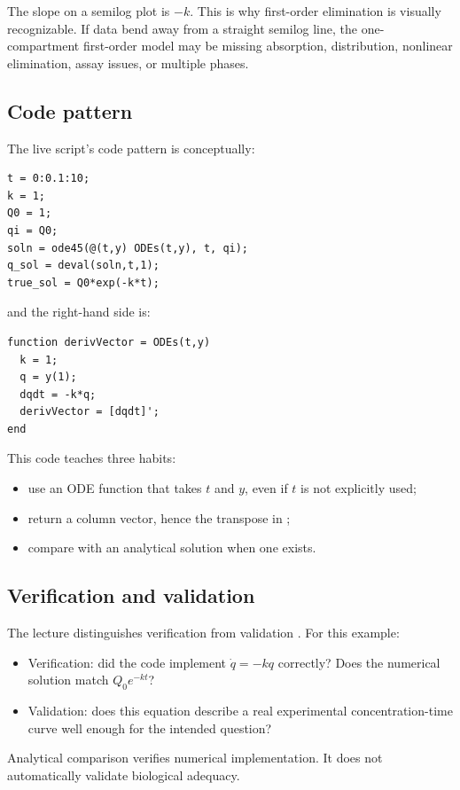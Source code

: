 \documentclass[a4paper]{article}
\newcommand{\code}[1]{\texttt{\detokenize{#1}}}
\begin{document}
The slope on a semilog plot is \(-k\). This is why first-order elimination is visually recognizable. If data bend away from a straight semilog line, the one-compartment first-order model may be missing absorption, distribution, nonlinear elimination, assay issues, or multiple phases.

\subsection{Code pattern}

The live script's code pattern is conceptually:
\begin{verbatim}
t = 0:0.1:10;
k = 1;
Q0 = 1;
qi = Q0;
soln = ode45(@(t,y) ODEs(t,y), t, qi);
q_sol = deval(soln,t,1);
true_sol = Q0*exp(-k*t);
\end{verbatim}
and the right-hand side is:
\begin{verbatim}
function derivVector = ODEs(t,y)
  k = 1;
  q = y(1);
  dqdt = -k*q;
  derivVector = [dqdt]';
end
\end{verbatim}

This code teaches three habits:
\begin{itemize}[leftmargin=2em]
  \item use an ODE function that takes \(t\) and \(y\), even if \(t\) is not explicitly used;
  \item return a column vector, hence the transpose in \code{[dqdt]'};
  \item compare with an analytical solution when one exists.
\end{itemize}

\subsection{Verification and validation}

The lecture distinguishes verification from validation \cite{bmeg671TranscriptAug292025}. For this example:
\begin{itemize}[leftmargin=2em]
  \item Verification: did the code implement \(\dot q=-kq\) correctly? Does the numerical solution match \(Q_0e^{-kt}\)?
  \item Validation: does this equation describe a real experimental concentration-time curve well enough for the intended question?
\end{itemize}
Analytical comparison verifies numerical implementation. It does not automatically validate biological adequacy.
\end{document}
